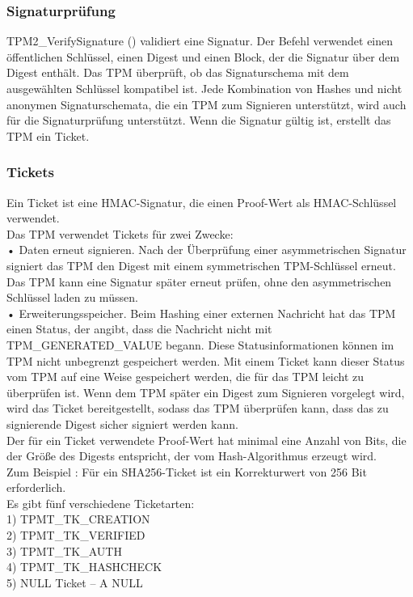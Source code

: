 \subsubsection{Signaturprüfung}
TPM2\_VerifySignature () validiert eine Signatur. Der Befehl verwendet einen öffentlichen Schlüssel, einen Digest und einen Block, der die Signatur über dem Digest enthält.
Das TPM überprüft, ob das Signaturschema mit dem ausgewählten Schlüssel kompatibel ist. Jede Kombination von Hashes und nicht anonymen Signaturschemata, die ein TPM zum Signieren unterstützt, wird auch für die Signaturprüfung unterstützt.
Wenn die Signatur gültig ist, erstellt das TPM ein Ticket.
\subsubsection{Tickets}
Ein Ticket ist eine HMAC-Signatur, die einen Proof-Wert als HMAC-Schlüssel verwendet.
 \\
 Das TPM verwendet Tickets für zwei Zwecke:
 \\
 • Daten erneut signieren. Nach der Überprüfung einer asymmetrischen Signatur signiert das TPM den Digest mit einem symmetrischen TPM-Schlüssel erneut. Das TPM kann eine Signatur später erneut prüfen, ohne den asymmetrischen Schlüssel laden zu müssen.
 \\
 • Erweiterungsspeicher. Beim Hashing einer externen Nachricht hat das TPM einen Status, der angibt, dass die Nachricht nicht mit TPM\_GENERATED\_VALUE begann. Diese Statusinformationen können im TPM nicht unbegrenzt gespeichert werden. Mit einem Ticket kann dieser Status vom TPM auf eine Weise gespeichert werden, die für das TPM leicht zu überprüfen ist. Wenn dem TPM später ein Digest zum Signieren vorgelegt wird, wird das Ticket bereitgestellt, sodass das TPM überprüfen kann, dass das zu signierende Digest sicher signiert werden kann.
 \\
 Der für ein Ticket verwendete Proof-Wert hat minimal eine Anzahl von Bits, die der Größe des Digests entspricht, der vom Hash-Algorithmus erzeugt wird.
 \\
 Zum Beispiel :
Für ein SHA256-Ticket ist ein Korrekturwert von 256 Bit erforderlich.
\\
Es gibt fünf verschiedene Ticketarten:
\\
1) TPMT\_TK\_CREATION
\\
2) TPMT\_TK\_VERIFIED
\\
3) TPMT\_TK\_AUTH
\\
4) TPMT\_TK\_HASHCHECK
\\
5) NULL Ticket – A NULL
\\
